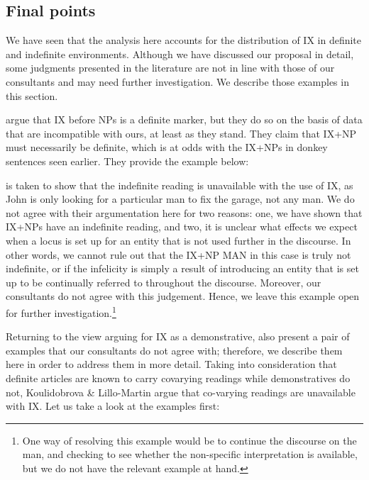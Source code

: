 \documentclass[output=paper,
modfonts
]{langscibook}
\begin{document}
\subsection{Final points}

We have seen that the analysis here accounts for the distribution of IX in definite and indefinite environments. Although we have discussed our proposal in detail, some judgments presented in the literature are not in line with those of our consultants and may need further investigation. We describe those examples in this section. \newpage

\citet{Bahanetal1995} argue that IX before NPs is a definite marker, but they do so on the basis of data that are incompatible with ours, at least as they stand. They claim that IX+NP must necessarily be definite, which is at odds with the IX+NPs in donkey sentences seen earlier. They provide the example below: 

\begin{exe}
\end{exe}

 is taken to show that the indefinite reading is unavailable with the use of IX, as John is only looking for a particular man to fix the garage, not any man. We do not agree with their argumentation here for two reasons: one, we have shown that IX+NPs have an indefinite reading, and two, it is unclear what effects we expect when a locus is set up for an entity that is not used further in the discourse. In other words, we cannot rule out that the IX+NP MAN in this case is truly not indefinite, or if the infelicity is simply a result of introducing an entity that is set up to be continually referred to throughout the discourse. Moreover, our consultants do not agree with this judgement. Hence, we leave this example open for further investigation.\footnote{One way of resolving this example would be to continue the discourse on the man, and checking to see whether the non-specific interpretation is available, but we do not have the relevant example at hand.} 


Returning to the view arguing for IX as a demonstrative, \citet{KoulidobrovaLilloMartin2016} also present a pair of examples that our consultants do not agree with; therefore, we describe them here in order to address them in more detail. Taking into consideration that definite articles are known to carry covarying readings while demonstratives do not, Koulidobrova \& Lillo-Martin argue that co-varying readings are unavailable with IX. Let us take a look at the  examples first:
\end{document}
